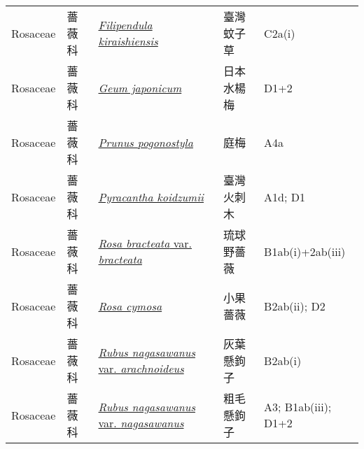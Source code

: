 {\begin{longtable}{L{2.5cm}L{2cm}L{5cm}L{2.5cm}L{3cm}}
    Rosaceae & 薔薇科 & \href{http://www.theplantlist.org/tpl1.1/search?q=Filipendula+kiraishiensis}{\textit{Filipendula kiraishiensis} } & 臺灣蚊子草 & C2a(i)    \\
    Rosaceae & 薔薇科 & \href{http://www.theplantlist.org/tpl1.1/search?q=Geum+japonicum}{\textit{Geum japonicum} } & 日本水楊梅 & D1+2    \\
    Rosaceae & 薔薇科 & \href{http://www.theplantlist.org/tpl1.1/search?q=Prunus+pogonostyla}{\textit{Prunus pogonostyla} } & 庭梅 & A4a    \\
    Rosaceae & 薔薇科 & \href{http://www.theplantlist.org/tpl1.1/search?q=Pyracantha+koidzumii}{\textit{Pyracantha koidzumii} } & 臺灣火刺木 & A1d; D1    \\
    Rosaceae & 薔薇科 & \href{http://www.theplantlist.org/tpl1.1/search?q=Rosa+bracteata+var.+bracteata}{\textit{Rosa bracteata} var. \textit{bracteata} } & 琉球野薔薇 & B1ab(i)+2ab(iii)    \\
    Rosaceae & 薔薇科 & \href{http://www.theplantlist.org/tpl1.1/search?q=Rosa+cymosa}{\textit{Rosa cymosa} } & 小果薔薇 & B2ab(ii); D2    \\
    Rosaceae & 薔薇科 & \href{http://www.theplantlist.org/tpl1.1/search?q=Rubus+nagasawanus+var.+arachnoideus}{\textit{Rubus nagasawanus} var. \textit{arachnoideus} } & 灰葉懸鉤子 & B2ab(i)    \\
    Rosaceae & 薔薇科 & \href{http://www.theplantlist.org/tpl1.1/search?q=Rubus+nagasawanus+var.+nagasawanus}{\textit{Rubus nagasawanus} var. \textit{nagasawanus} } & 粗毛懸鉤子 & A3; B1ab(iii); D1+2    \\

\end{longtable}}
